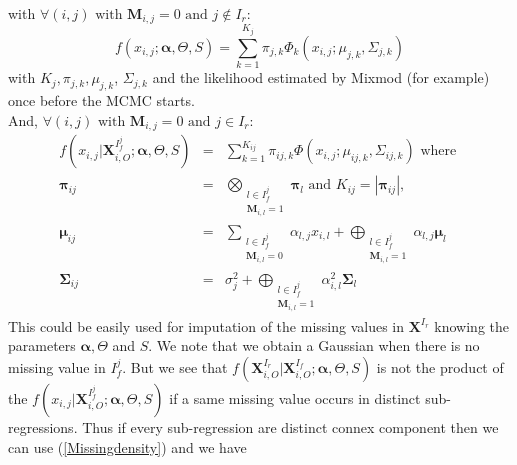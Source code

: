 \documentclass[11pt,a4paper]{report}
\begin{document}
with	  $\forall (i,j) \textrm{ with } \boldsymbol{M}_{i,j}= 0 \textrm{ and } j \notin I_r $:
	 \begin{equation}
	 f(x_{i,j};\boldsymbol{\alpha},\Theta,S)=\sum_{k=1}^{K_j}\pi_{j,k}\Phi_k(x_{i,j};\mu_{j,k},\Sigma_{j,k}) \label{likmissdroite}
	 \end{equation} with $K_j,\pi_{j,k}, \mu_{j,k}$, $\Sigma_{j,k}$ and the likelihood estimated by Mixmod (for example) once before the MCMC starts. 
\\
	 And, $\forall (i,j) \textrm{ with } \boldsymbol{M}_{i,j}= 0 \textrm{ and } j \in I_r $:
		\begin{eqnarray}
 f(x_{i,j}|\boldsymbol{X}_{i,O}^{I_f^j};\boldsymbol{\alpha},\Theta,S)&=& \sum_{k=1}^{K_{ij}}\pi_{ij,k}\Phi(x_{i,j};\mu_{ij,k},\Sigma_{ij,k}) \textrm{ where }  \label{Missingdensity}\\
				\boldsymbol{\pi}_{ij} &=& \bigotimes_{\substack{l \in I_f^j \\ \boldsymbol{M}_{i,l}=1 } } \boldsymbol{\pi}_l \textrm{ and  }K_{ij}=|\boldsymbol{\pi}_{ij}| ,\\
				\boldsymbol{\mu}_{ij}&=& \sum_{\substack{l \in I_f^j \\ \boldsymbol{M}_{i,l}=0  }}\alpha_{l,j}x_{i,l} + \bigoplus_{\substack{l \in I_f^j \\ \boldsymbol{M}_{i,l}=1  }} \alpha_{l,j} \boldsymbol{\mu}_l \\
				\boldsymbol{\Sigma}_{ij} &=& \sigma_j^2 + \bigoplus_{\substack{l \in I_f^j \\ \boldsymbol{M}_{i,l}=1 }}\alpha_{i,l}^2 \boldsymbol{\Sigma}_l		
		\end{eqnarray}		 
		This could be easily used for imputation of the missing values in $\boldsymbol{X}^{I_r}$ knowing the parameters $\boldsymbol{\alpha}, \Theta$ and $S$. We note that we obtain a Gaussian when there is no missing value in $I_f^j$.
		But we see that	$f(\boldsymbol{X}^{I_r}_{i,O}|\boldsymbol{X}^{I_f}_{i,O};\boldsymbol{\alpha},\Theta,S)$ is not the product of the $f(x_{i,j}|\boldsymbol{X}_{i,O}^{I_f^j};\boldsymbol{\alpha},\Theta,S) $	if a same missing value occurs in distinct sub-regressions. Thus if every sub-regression are distinct connex component then we can use (\ref{Missingdensity}) and we have
\end{document}
